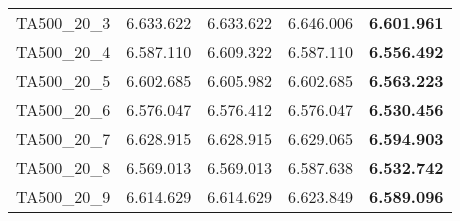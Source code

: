 \begin{tabular}{cc|cc|c}
TA500\_20\_3       & 6.633.622        & 6.633.622        & 6.646.006        & {\bf 6.601.961} \\ 
TA500\_20\_4       & 6.587.110        & 6.609.322        & 6.587.110        & {\bf 6.556.492} \\ 
TA500\_20\_5       & 6.602.685        & 6.605.982        & 6.602.685        & {\bf 6.563.223} \\ 
TA500\_20\_6       & 6.576.047        & 6.576.412        & 6.576.047        & {\bf 6.530.456} \\ 
TA500\_20\_7       & 6.628.915        & 6.628.915        & 6.629.065        & {\bf 6.594.903} \\ 
TA500\_20\_8       & 6.569.013        & 6.569.013        & 6.587.638        & {\bf 6.532.742} \\ 
TA500\_20\_9       & 6.614.629        & 6.614.629        & 6.623.849        & {\bf 6.589.096} \\ 
\end{tabular}